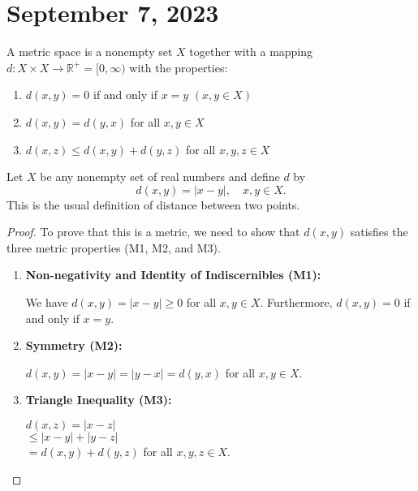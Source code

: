 \section{September 7, 2023}
\begin{definition}
    A metric space is a nonempty set \( X \) together with a mapping \( d: X \times X \rightarrow \mathbb{R}^+ = [ 0, \infty) \) with the properties:
    \begin{enumerate}
        \item \( d(x, y) = 0 \) if and only if \( x = y \) \quad \( (x, y \in X) \)
        \item \( d(x, y) = d(y, x) \) for all \( x, y \in X \)
        \item \( d(x, z) \leq d(x, y) + d(y, z) \) for all \( x, y, z \in X \)
    \end{enumerate}
\end{definition}

\begin{example}
    Let \( X \) be any nonempty set of real numbers and define \( d \) by
    \[
    d(x, y) = |x - y|, \quad x, y \in X.
    \]
    This is the usual definition of distance between two points. 
\end{example}
\begin{proof}
To prove that this is a metric, we need to show that \( d(x, y) \) satisfies the three metric properties (M1, M2, and M3).

\begin{enumerate}
    \item \textbf{Non-negativity and Identity of Indiscernibles (M1):}
    
    We have \( d(x, y) = |x - y| \geq 0 \) for all \( x, y \in X \). Furthermore, \( d(x, y) = 0 \) if and only if \( x = y \).
    
    \item \textbf{Symmetry (M2):}
    
    \( d(x, y) = |x - y| = |y - x| = d(y, x) \) for all \( x, y \in X \).
    
    \item \textbf{Triangle Inequality (M3):}
    
    \( d(x, z) = |x - z| \) \\
    \( \leq |x - y| + |y - z| \) \\
    \( = d(x, y) + d(y, z) \) for all \( x, y, z \in X \).
\end{enumerate}
\end{proof}


